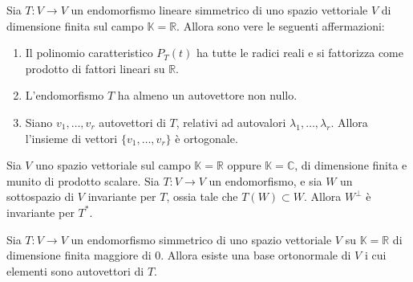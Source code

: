 \begin{theorem}
	Sia $T : V \to V$ un endomorfismo lineare simmetrico di uno spazio vettoriale
	$V$ di dimensione finita sul campo $\mathbb{K} = \mathbb{R}$. Allora sono vere
	le seguenti affermazioni:
	\begin{enumerate}
		\item Il polinomio caratteristico $P_T(t)$ ha tutte le radici reali e si
		      fattorizza come prodotto di fattori lineari su $\mathbb{R}$.
		\item L'endomorfismo $T$ ha almeno un autovettore non nullo.
		\item Siano $v_1, \dots, v_r$ autovettori di $T$, relativi ad autovalori
		$\lambda_1, \dots, \lambda_r$. Allora l'insieme di vettori 
		$\{v_1, \dots, v_r\}$ \`e ortogonale.
	\end{enumerate}
\end{theorem}

\begin{lemma}
	Sia $V$ uno spazio vettoriale sul campo $\mathbb{K} = \mathbb{R}$ oppure
	$\mathbb{K} = \mathbb{C}$, di dimensione finita e munito di prodotto scalare.
	Sia $T : V \to V$ un endomorfismo, e sia $W$ un sottospazio di $V$ invariante
	per $T$, ossia tale che $T(W) \subset W$. Allora $W^\perp$ \`e invariante per
	$T^*$.
\end{lemma}

\begin{theorem}
	Sia $T : V  \to V$ un endomorfismo simmetrico di uno spazio vettoriale $V$ su
	$\mathbb{K} = \mathbb{R}$ di dimensione finita maggiore di 0. Allora esiste una
	base ortonormale di $V$ i cui elementi sono autovettori di $T$.
\end{theorem}

